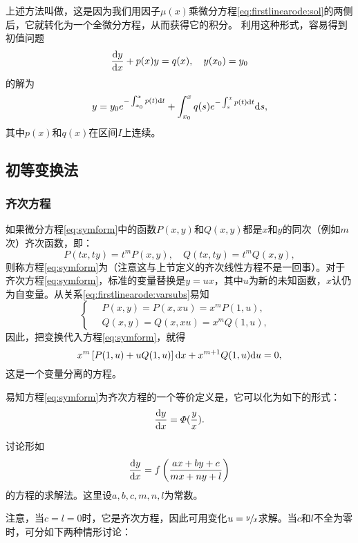 上述方法叫做，这是因为我们用因子$\mu(x)$乘微分方程\eqref{eq:firstlinearode:sol}的两侧后，它就转化为一个全微分方程，从而获得它的积分。
利用这种形式，容易得到初值问题
\begin{equation}\label{eq:firstlinearode:initval}
\frac{\mathrm{d} y}{\mathrm{d} x}+p(x)y=q(x),\quad y(x_0)=y_0
\end{equation}
的解为
\begin{equation}\label{eq:firstlinearode:initval:sol}
y=y_0e^{-\int_{x_0}^xp(t)\mathrm{d} t}+\int_{x_0}^xq(s)e^{-\int_s^xp(t)\mathrm{d} t}\mathrm{d} s,
\end{equation}
其中$p(x)$和$q(x)$在区间$I$上连续。

\subsection{初等变换法}
\subsubsection{齐次方程}
如果微分方程\eqref{eq:symform}中的函数$P(x,y)$和$Q(x,y)$都是$x$和$y$的同次（例如$m$次）齐次函数，即：
\begin{equation}\label{eq:firstlinearode:varsubs}
P(tx,ty)=t^mP(x,y),\quad Q(tx,ty)=t^mQ(x,y),
\end{equation}
则称方程\eqref{eq:symform}为（注意这与上节定义的齐次线性方程不是一回事）。对于齐次方程\eqref{eq:symform}，标准的变量替换是$y=ux$，其中$u$为新的未知函数，$x$认仍为自变量。从关系\eqref{eq:firstlinearode:varsubs}易知
\begin{equation*}
    \begin{cases}
        \quad P(x,y)=P(x,xu)=x^mP(1,u), &\\
        \quad Q(x,y)=Q(x,xu)=x^mQ(1,u), &
    \end{cases}
\end{equation*}
因此，把变换代入方程\eqref{eq:symform}，就得
\[
x^m\left[P(1,u)+uQ(1,u)\right]\mathrm{d} x+x^{m+1}Q(1,u)\mathrm{d} u=0,
\]
这是一个变量分离的方程。

易知方程\eqref{eq:symform}为齐次方程的一个等价定义是，它可以化为如下的形式：
\[
\frac{\mathrm{d} y}{\mathrm{d} x}=\varPhi(\frac yx).
\]

\begin{example}
讨论形如\[
\frac{\mathrm{d} y}{\mathrm{d} x}=f\left(\frac{ax+by+c}{mx+ny+l}\right)
\]的方程的求解法。这里设$a,b,c,m,n,l$为常数。
\end{example}

注意，当$c=l=0$时，它是齐次方程，因此可用变化$u=\sfrac{y}{x}$求解。当$c$和$l$不全为零时，可分如下两种情形讨论：

